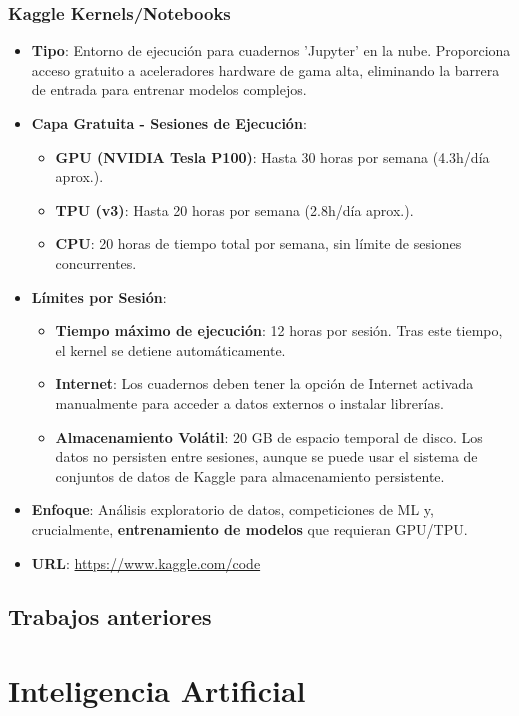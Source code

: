\subsubsection*{Kaggle Kernels/Notebooks}
\begin{itemize}
	\item \textbf{Tipo}: Entorno de ejecución para cuadernos 'Jupyter' en la nube. Proporciona acceso gratuito a aceleradores hardware de gama alta, eliminando la barrera de entrada para entrenar modelos complejos.
	\item \textbf{Capa Gratuita - Sesiones de Ejecución}:
	\begin{itemize}
		\item \textbf{GPU (NVIDIA Tesla P100)}: Hasta 30 horas por semana (4.3h/día aprox.).
		\item \textbf{TPU (v3)}: Hasta 20 horas por semana (2.8h/día aprox.).
		\item \textbf{CPU}: 20 horas de tiempo total por semana, sin límite de sesiones concurrentes.
	\end{itemize}
	\item \textbf{Límites por Sesión}:
	\begin{itemize}
		\item \textbf{Tiempo máximo de ejecución}: 12 horas por sesión. Tras este tiempo, el kernel se detiene automáticamente.
		\item \textbf{Internet}: Los cuadernos deben tener la opción de Internet activada manualmente para acceder a datos externos o instalar librerías.
		\item \textbf{Almacenamiento Volátil}: 20 GB de espacio temporal de disco. Los datos no persisten entre sesiones, aunque se puede usar el sistema de conjuntos de datos de Kaggle para almacenamiento persistente.
	\end{itemize}
	\item \textbf{Enfoque}: Análisis exploratorio de datos, competiciones de ML y, crucialmente, \textbf{entrenamiento de modelos} que requieran GPU/TPU.
	\item \textbf{URL}: \url{https://www.kaggle.com/code}
\end{itemize}


	\subsection{Trabajos anteriores}


\section{Inteligencia Artificial}

